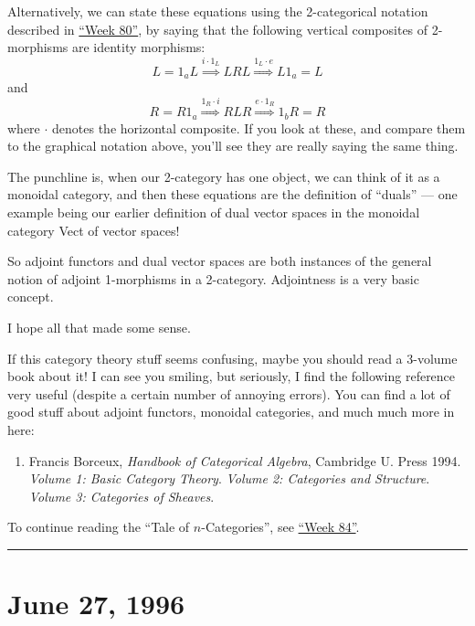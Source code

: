 \documentclass{article}
\def\tightlist{}
\begin{document}
Alternatively, we can state these equations using the 2-categorical
notation described in \protect\hyperlink{week80}{``Week 80''}, by saying
that the following vertical composites of 2-morphisms are identity
morphisms:
\[L = 1_aL\overset{i\cdot1_L}{\Longrightarrow}LRL\overset{1_L\cdot e}{\Longrightarrow}L1_a = L\]
and
\[R = R1_a\overset{1_R\cdot i}{\Longrightarrow}RLR\overset{e\cdot1_R}{\Longrightarrow}1_bR = R\]
where \(\cdot\) denotes the horizontal composite. If you look at these,
and compare them to the graphical notation above, you'll see they are
really saying the same thing.

The punchline is, when our 2-category has one object, we can think of it
as a monoidal category, and then these equations are the definition of
``duals'' --- one example being our earlier definition of dual vector
spaces in the monoidal category Vect of vector spaces!

So adjoint functors and dual vector spaces are both instances of the
general notion of adjoint 1-morphisms in a 2-category. Adjointness is a
very basic concept.

I hope all that made some sense.

If this category theory stuff seems confusing, maybe you should read a
3-volume book about it! I can see you smiling, but seriously, I find the
following reference very useful (despite a certain number of annoying
errors). You can find a lot of good stuff about adjoint functors,
monoidal categories, and much much more in here:

\begin{enumerate}
\def\labelenumi{\arabic{enumi})}
\setcounter{enumi}{1}
\tightlist
\item
  Francis Borceux, \emph{Handbook of Categorical Algebra}, Cambridge U.
  Press 1994. \emph{Volume 1: Basic Category Theory}. \emph{Volume 2:
  Categories and Structure}. \emph{Volume 3: Categories of Sheaves}.
\end{enumerate}

To continue reading the ``Tale of \(n\)-Categories'', see
\protect\hyperlink{week84}{``Week 84''}.

\begin{center}\rule{0.5\linewidth}{0.5pt}\end{center}
\hypertarget{week84}{%
\section{June 27, 1996}\label{week84}}
\end{document}
